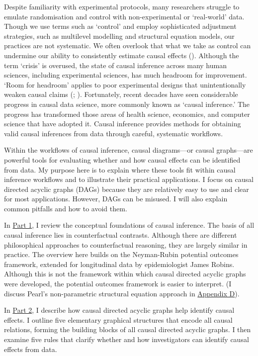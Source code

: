 \documentclass[
  single column]{article}
\begin{document}
Despite familiarity with experimental protocols, many researchers
struggle to emulate randomisation and control with non-experimental or
`real-world' data. Though we use terms such as `control' and employ
sophisticated adjustment strategies, such as multilevel modelling and
structural equation models, our practices are not systematic. We often
overlook that what we take as control can undermine our ability to
consistently estimate causal effects
(). Although
the term `crisis' is overused, the state of causal inference across many
human sciences, including experimental sciences, has much headroom for
improvement. `Room for headroom' applies to poor experimental designs
that unintentionally weaken causal claims
(;
). Fortunately,
recent decades have seen considerable progress in causal data science,
more commonly known as `causal inference.' The progress has transformed
those areas of health science, economics, and computer science that have
adopted it. Causal inference provides methods for obtaining valid causal
inferences from data through careful, systematic workflows.

Within the workflows of causal inference, causal diagrams---or causal
graphs---are powerful tools for evaluating whether and how causal
effects can be identified from data. My purpose here is to explain where
these tools fit within causal inference workflows and to illustrate
their practical applications. I focus on causal directed acyclic graphs
(DAGs) because they are relatively easy to use and clear for most
applications. However, DAGs can be misused. I will also explain common
pitfalls and how to avoid them.

In \hyperref[id-sec-1]{Part 1}, I review the conceptual foundations of
causal inference. The basis of all causal inference lies in
counterfactual contrasts. Although there are different philosophical
approaches to counterfactual reasoning, they are largely similar in
practice. The overview here builds on the Neyman-Rubin potential
outcomes framework, extended for longitudinal data by epidemiologist
James Robins. Although this is not the framework within which causal
directed acyclic graphs were developed, the potential outcomes framework
is easier to interpret. (I discuss Pearl's non-parametric structural
equation approach in \hyperref[id-app-d]{Appendix D}).

In \hyperref[id-sec-2]{Part 2}, I describe how causal directed acyclic
graphs help identify causal effects. I outline five elementary graphical
structures that encode all causal relations, forming the building blocks
of all causal directed acyclic graphs. I then examine five rules that
clarify whether and how investigators can identify causal effects from
data.
\end{document}
